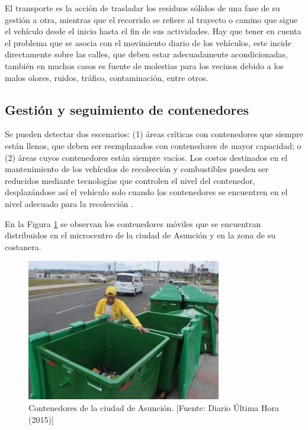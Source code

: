 El transporte es la acción de trasladar los residuos sólidos de una fase de su gestión a otra, mientras que el recorrido se refiere al trayecto o camino que sigue el vehículo desde el inicio hasta el fin de sus actividades. Hay que tener en cuenta el problema que se asocia con el movimiento diario de los vehículos, este incide directamente sobre las calles, que deben estar adecuadamente acondicionadas, también en muchos casos es fuente de molestias para los vecinos debido a los malos olores, ruidos, tráfico, contaminación, entre otros.

\subsection{Gestión y seguimiento de contenedores}

Se pueden detectar dos escenarios: (1) áreas críticas con contenedores que siempre están llenos, que deben ser reemplazados con contenedores de mayor capacidad; o (2) áreas cuyos contenedores están siempre vacíos. Los costos destinados en el mantenimiento de los vehículos de recolección y combustibles pueden ser reducidos mediante tecnologías que controlen el nivel del contenedor, desplazándose así el vehículo solo cuando los contenedores se encuentren en el nivel adecuado para la recolección \citep{VitorinodeSouzaMelare2017TechnologiesReview, Akhtar2017BacktrackingOptimization}.

En la Figura \ref{fig:contenedoresMDA} se observan los contenedores móviles que se encuentran distribuidos en el microcentro de la ciudad de Asunción y en la zona de su costanera.

\begin{figure}[H]
    \centering
    \includegraphics[width=8.5cm]{contenedores_mda.png}
    \caption{Contenedores de la ciudad de Asunción. [Fuente: Diario Última Hora (2015)]}
    \label{fig:contenedoresMDA}
\end{figure}

